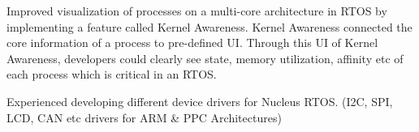 \documentclass[]{deedy-resume-openfont}
\begin{document}
\begin{minipage}[t]{0.63\textwidth}

\begin{tightemize}

\item Improved visualization of processes on a multi-core architecture in RTOS by implementing a feature called Kernel Awareness. Kernel Awareness connected the core information of a process to pre-defined UI. Through this UI of Kernel Awareness, developers could clearly see state, memory utilization, affinity etc of each process which is critical in an RTOS.

\item Experienced developing different device drivers for Nucleus RTOS. (I2C, SPI, LCD, CAN etc drivers for ARM \& PPC Architectures)

\end{tightemize}
\sectionsep




\sectionsep








\end{minipage}
\end{document}
